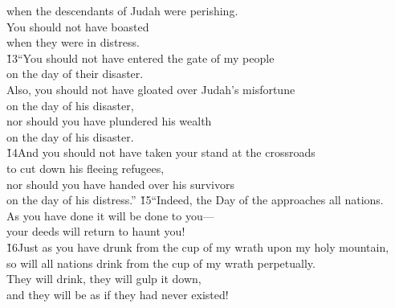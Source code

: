 \begin{poetry}
\poemll    when the descendants of Judah were perishing. \\
\poeml You should not have boasted \\
\poemll    when they were in distress. \\
\poeml \v{13}``You should not have entered the gate of my people \\
\poemll    on the day of their disaster. \\
\poeml Also, you should not have gloated over Judah's misfortune \\
\poemll    on the day of his disaster, \\
\poeml nor should you have plundered his wealth \\
\poemll    on the day of his disaster. \\
\poeml \v{14}And you should not have taken your stand at the crossroads \\
\poemll    to cut down his fleeing refugees, \\
\poeml nor should you have handed over his survivors \\
\poemll    on the day of his distress.''
\poeml \v{15}``Indeed, the Day of the  approaches all nations. \\
\poemll    As you have done it will be done to you--- \\
\poemlll       your deeds will return to haunt you! \\
\poeml \v{16}Just as you have drunk from the cup of my wrath upon my holy mountain, \\
\poemll    so will all nations drink from the cup of my wrath perpetually. \\
\poeml They will drink, they will gulp it down, \\
\poemll    and they will be as if they had never existed! \\

\end{poetry}
